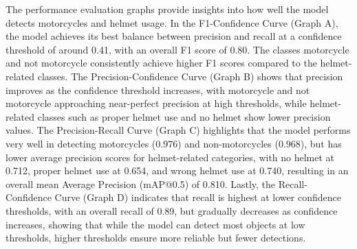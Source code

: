 \begin{refsection}
\noindent
The performance evaluation graphs provide insights into how well the model detects motorcycles and helmet usage. In the F1-Confidence Curve (Graph A), the model achieves its best balance between precision and recall at a confidence threshold of around 0.41, with an overall F1 score of 0.80. The classes motorcycle and not motorcycle consistently achieve higher F1 scores compared to the helmet-related classes. The Precision-Confidence Curve (Graph B) shows that precision improves as the confidence threshold increases, with motorcycle and not motorcycle approaching near-perfect precision at high thresholds, while helmet-related classes such as proper helmet use and no helmet show lower precision values. The Precision-Recall Curve (Graph C) highlights that the model performs very well in detecting motorcycles (0.976) and non-motorcycles (0.968), but has lower average precision scores for helmet-related categories, with no helmet at 0.712, proper helmet use at 0.654, and wrong helmet use at 0.740, resulting in an overall mean Average Precision (mAP@0.5) of 0.810. Lastly, the Recall-Confidence Curve (Graph D) indicates that recall is highest at lower confidence thresholds, with an overall recall of 0.89, but gradually decreases as confidence increases, showing that while the model can detect most objects at low thresholds, higher thresholds ensure more reliable but fewer detections.

\begin{figure}[H]
\centering


\end{figure}
\end{refsection}

